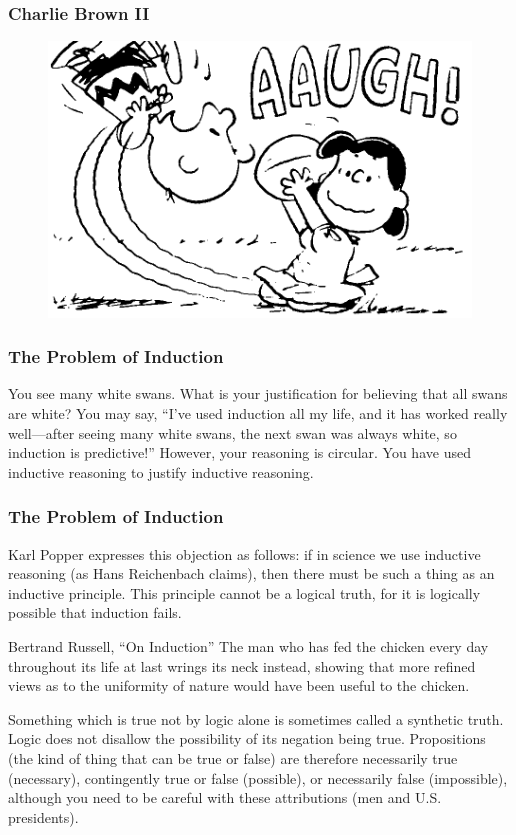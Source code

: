 \documentclass[xcolor=dvipsnames]{beamer}
\begin{document}
\begin{frame}
  \frametitle{Charlie Brown II}
  \begin{figure}[h]
    \includegraphics[scale=0.5]{./charliebrown2.png}
  \end{figure}
\end{frame}

\begin{frame}
  \frametitle{The Problem of Induction}
  You see many white swans. What is your justification for believing
  that all swans are white? You may say, ``I've used induction all my
  life, and it has worked really well---after seeing many white swans,
  the next swan was always white, so induction is predictive!''
  However, your reasoning is circular. You have used inductive
  reasoning to justify inductive reasoning.
\end{frame}

\begin{frame}
  \frametitle{The Problem of Induction}
Karl Popper expresses this objection as follows: if in science we use
inductive reasoning (as Hans Reichenbach claims), then there must be
such a thing as an inductive principle. This principle cannot be a
logical truth, for it is logically possible that induction fails.
\begin{block}{Bertrand Russell, ``On Induction''}
  The man who has fed the chicken every day throughout its life at
  last wrings its neck instead, showing that more refined views as to
  the uniformity of nature would have been useful to the chicken.
\end{block}
Something which is true not by logic alone is sometimes called a
synthetic truth. Logic does not disallow the possibility of its
negation being true. Propositions (the kind of thing that can be true
or false) are therefore necessarily true (necessary), contingently
true or false (possible), or necessarily false (impossible), although
you need to be careful with these attributions (men and U.S.
presidents).
\end{frame}
\end{document}
